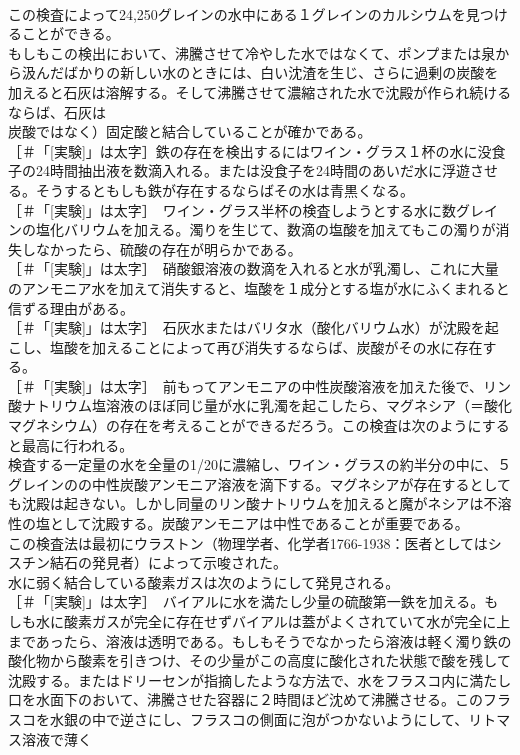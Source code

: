 \documentclass[8pt]{extreport}
\begin{document}
\begin{CJK}{UTF8}{min}
\\	この検査によって24,250グレインの水中にある１グレインのカルシウムを見つけることができる。
\\	もしもこの検出において、沸騰させて冷やした水ではなくて、ポンプまたは泉から汲んだばかりの新しい水のときには、白い沈渣を生じ、さらに過剰の炭酸を加えると石灰は溶解する。そして沸騰させて濃縮された水で沈殿が作られ続けるならば、石灰は
\\	炭酸ではなく）固定酸と結合していることが確かである。
\\	[実験]［＃「[実験]」は太字］鉄の存在を検出するにはワイン・グラス１杯の水に没食子の24時間抽出液を数滴入れる。または没食子を24時間のあいだ水に浮遊させる。そうするともしも鉄が存在するならばその水は青黒くなる。
\\	[実験]［＃「[実験]」は太字］　ワイン・グラス半杯の検査しようとする水に数グレインの塩化バリウムを加える。濁りを生じて、数滴の塩酸を加えてもこの濁りが消失しなかったら、硫酸の存在が明らかである。
\\	[実験]［＃「[実験]」は太字］　硝酸銀溶液の数滴を入れると水が乳濁し、これに大量のアンモニア水を加えて消失すると、塩酸を１成分とする塩が水にふくまれると信ずる理由がある。
\\	[実験]［＃「[実験]」は太字］　石灰水またはバリタ水（酸化バリウム水）が沈殿を起こし、塩酸を加えることによって再び消失するならば、炭酸がその水に存在する。
\\	[実験]［＃「[実験]」は太字］　前もってアンモニアの中性炭酸溶液を加えた後で、リン酸ナトリウム塩溶液のほぼ同じ量が水に乳濁を起こしたら、マグネシア（＝酸化マグネシウム）の存在を考えることができるだろう。この検査は次のようにすると最高に行われる。
\\	検査する一定量の水を全量の1/20に濃縮し、ワイン・グラスの約半分の中に、５グレインのの中性炭酸アンモニア溶液を滴下する。マグネシアが存在するとしても沈殿は起きない。しかし同量のリン酸ナトリウムを加えると魔がネシアは不溶性の塩として沈殿する。炭酸アンモニアは中性であることが重要である。
\\	この検査法は最初にウラストン（物理学者、化学者1766-1938：医者としてはシスチン結石の発見者）によって示唆された。
\\	水に弱く結合している酸素ガスは次のようにして発見される。
\\	[実験]［＃「[実験]」は太字］　バイアルに水を満たし少量の硫酸第一鉄を加える。もしも水に酸素ガスが完全に存在せずバイアルは蓋がよくされていて水が完全に上まであったら、溶液は透明である。もしもそうでなかったら溶液は軽く濁り鉄の酸化物から酸素を引きつけ、その少量がこの高度に酸化された状態で酸を残して沈殿する。またはドリーセンが指摘したような方法で、水をフラスコ内に満たし口を水面下のおいて、沸騰させた容器に２時間ほど沈めて沸騰させる。このフラスコを水銀の中で逆さにし、フラスコの側面に泡がつかないようにして、リトマス溶液で薄く

\end{CJK}
\end{document}
